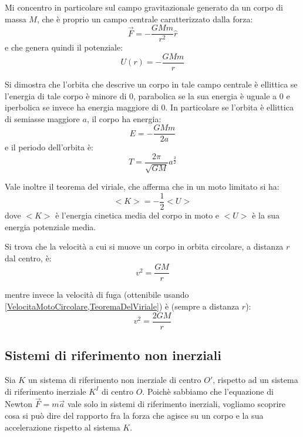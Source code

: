 \documentclass[../main.tex]{subfiles}
\begin{document}
Mi concentro in particolare sul campo gravitazionale generato da un corpo di massa $M$, che è proprio un campo 
centrale caratterizzato dalla forza:
\begin{equation*}
	\vec{F}=-\frac{GMm}{r^2}\hat{r}
\end{equation*}
e che genera quindi il potenziale:
\begin{equation*}
	U(r)=-\frac{GMm}{r}
\end{equation*}

Si dimostra che l'orbita che descrive un corpo in tale campo centrale è ellittica se l'energia di tale corpo è
minore di 0, parabolica se la sua energia è uguale a 0 e iperbolica se invece ha energia maggiore di 0.
In particolare se l'orbita è ellittica di semiasse maggiore $a$, il corpo ha energia:
\begin{equation} \label{EnergiaTotaleOrbita}
	E=-\frac{GMm}{2a}
\end{equation}
e il periodo dell'orbita è:
\begin{equation} \label{PeriodoOrbita}
	T=\frac{2\pi}{\sqrt{GM}}a^{\frac{3}{2}}
\end{equation}

Vale inoltre il teorema del viriale, che afferma che in un moto limitato si ha:
\begin{equation} \label{TeoremaDelViriale}
	<K>=-\frac{1}{2}<U>
\end{equation}
dove $<K>$ è l'energia cinetica media del corpo in moto e $<U>$ è la sua energia potenziale media.

Si trova che la velocità a cui si muove un corpo in orbita circolare, a distanza $r$ dal centro, è:
\begin{equation} \label{VelocitaMotoCircolare}
	v^2=\frac{GM}{r}
\end{equation}

mentre invece la velocità di fuga (ottenibile usando \cref{VelocitaMotoCircolare,TeoremaDelViriale}) è (sempre a distanza $r$):
\begin{equation} \label{VelocitaDiFuga}
	v^2=\frac{2GM}{r}
\end{equation}




\subsection{Sistemi di riferimento non inerziali}
Sia $K$ un sistema di riferimento non inerziale di centro $O'$, rispetto ad un sistema di riferimento
inerziale $K^I$ di centro $O$. Poichè sabbiamo che l'equazione di Newton $\vec{F}=m\vec{a}$
vale solo in sistemi di riferimento inerziali, vogliamo scoprire cosa si può dire del rapporto fra la forza
che agisce su un corpo e la sua accelerazione rispetto al sistema $K$.
\end{document}
